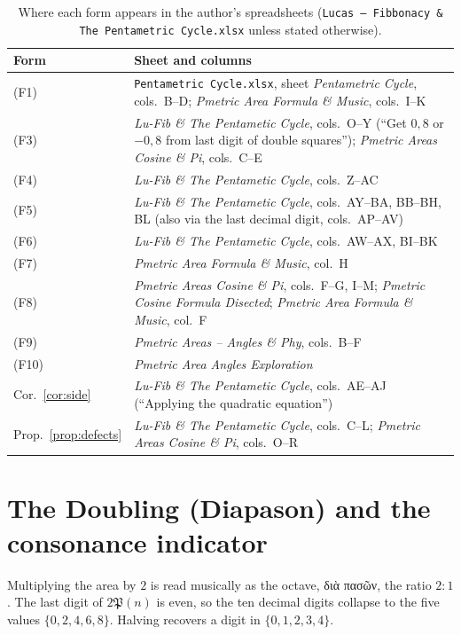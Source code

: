 \documentclass[11pt,a4paper]{article}
\newcommand{\gr}[1]{{\greekfont #1}}                 %
\newcommand{\Pent}{\mathfrak{P}}                      %
\theoremstyle{plain}
\theoremstyle{definition}
\theoremstyle{remark}
\begin{document}
\begin{table}[ht]
\centering\small
\caption{Where each form appears in the author's spreadsheets (\texttt{Lucas -- Fibbonacy \& The Pentametric Cycle.xlsx} unless stated otherwise).}\label{tab:sources}
\renewcommand{\arraystretch}{1.15}
\begin{tabularx}{\textwidth}{@{}lX@{}}
\toprule
Form & Sheet and columns \\
\midrule
(F1) & \texttt{Pentametric Cycle.xlsx}, sheet \emph{Pentametric Cycle}, cols.\ B–D; \emph{Pmetric Area Formula \& Music}, cols.\ I–K \\
(F3) & \emph{Lu-Fib \& The Pentametic Cycle}, cols.\ O–Y (“Get $0{,}8$ or $-0{,}8$ from last digit of double squares”); \emph{Pmetric Areas Cosine \& Pi}, cols.\ C–E \\
(F4) & \emph{Lu-Fib \& The Pentametic Cycle}, cols.\ Z–AC \\
(F5) & \emph{Lu-Fib \& The Pentametic Cycle}, cols.\ AY–BA, BB–BH, BL (also via the last decimal digit, cols.\ AP–AV) \\
(F6) & \emph{Lu-Fib \& The Pentametic Cycle}, cols.\ AW–AX, BI–BK \\
(F7) & \emph{Pmetric Area Formula \& Music}, col.\ H \\
(F8) & \emph{Pmetric Areas Cosine \& Pi}, cols.\ F–G, I–M; \emph{Pmetric Cosine Formula Disected}; \emph{Pmetric Area Formula \& Music}, col.\ F \\
(F9) & \emph{Pmetric Areas -- Angles \& Phy}, cols.\ B–F \\
(F10) & \emph{Pmetric Area Angles Exploration} \\
Cor.~\ref{cor:side} & \emph{Lu-Fib \& The Pentametic Cycle}, cols.\ AE–AJ (“Applying the quadratic equation”) \\
Prop.~\ref{prop:defects} & \emph{Lu-Fib \& The Pentametic Cycle}, cols.\ C–L; \emph{Pmetric Areas Cosine \& Pi}, cols.\ O–R \\
\bottomrule
\end{tabularx}
\end{table}

\section{The Doubling (Diapason) and the consonance indicator}\label{sec:doubling}

Multiplying the area by $2$ is read musically as the octave, \gr{διὰ πασῶν}, the ratio $2:1$. The last digit of $2\Pent(n)$ is even, so the ten decimal digits collapse to the five values $\{0,2,4,6,8\}$. Halving recovers a digit in $\{0,1,2,3,4\}$.
\end{document}

